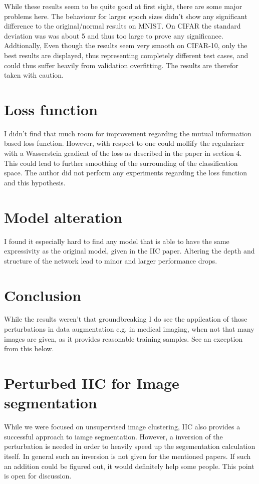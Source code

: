 \documentclass[]{article}
\begin{document}
While these results seem to be quite good at first sight, there are some major problems here. The behaviour for larger epoch sizes didn't show any significant difference to the original/normal results on MNIST. On CIFAR the standard deviation was was about 5 and thus too large to prove any significance. Addtionally, Even though the results seem very smooth on CIFAR-10, only the best results are displayed, thus representing completely different test cases, and could thus suffer heavily from validation overfitting. The results are therefor taken with caution.\\

\section{Loss function}
I didn't find that much room for improvement regarding the mutual information based loss function. However, with respect to \cite{Tikhonov} one could mollify the regularizer with a Wasserstein gradient of the loss as described in the paper in section 4. This could lead to further smoothing of the surrounding of the classification space. The author did not perform any experiments regarding the loss function and this hypothesis.

\section{Model alteration}
I found it especially hard to find any model that is able to have the same expressivity as the original model, given in the IIC paper. Altering the depth and structure of the network lead to minor and larger performance drops. 

\section{Conclusion}
While the results weren't that groundbreaking I do see the appilcation of those perturbations in data augmentation e.g. in medical imaging, when not that many images are given, as it provides reasonable training samples. See an exception from this below.


\section{Perturbed IIC for Image segmentation}

While we were focused on unsupervised image clustering, IIC also provides a successful approach to iamge segmentation. However, a inversion of the perturbation is needed in order to heavily speed up the segementation calculation itself. In general such an inversion is not given for the mentioned papers. If such an addition could be figured out, it would definitely help some people. This point is open for discussion.
\end{document}
